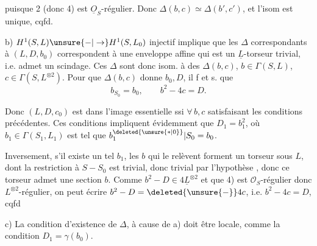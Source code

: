 puisque 2  (donc 4) est $\underline O_S$-régulier. Donc $\Delta(b,c)\simeq\Delta(b',c')$, et l'isom est unique, cqfd.

b)  $H^1(S,L)\unsure{-|\to}H^1(S,L_0)$ injectif implique que les $\Delta$ correspondants à $(L,D,b_0)$ correspondent à une enveloppe affine qui est un $\underline L$-torseur trivial, i.e. admet un scindage. Ces $\Delta$ sont donc isom. à des $\Delta(b,c)$,  $b\in\Gamma(S,L)$, $c\in\Gamma(S,L^{\otimes2})$.  Pour que $\Delta(b,c)$ donne $b_0,D$, il f et s. que
\[b_{S_0}=b_0,\qquad b^2-4c=D.\]

Donc $(L,D,c_0)$ est dans l'image essentielle ssi $\forall\,b,c$ satisfaisant les conditions précédentes. Ces conditions impliquent évidemment que $D_1=b_1^2$, où $b_1\in\Gamma(S_1,L_1)$ est tel que $b_1^{\deleted{\unsure{*|0}}}|S_0=b_0$.

Inversement, s'il existe un tel $b_1$,  les $b$ qui le relèvent forment un torseur sous $L$,  dont la restriction à $S-S_0$ est trivial, donc  trivial par l'hypothèse , donc ce torseur admet  une section $b$. Comme $b^2-D\in4\underline L^{\otimes2}$ et que  4) est $\mathcal O_S$-régulier donc $L^{\otimes2}$-régulier, on peut écrire $b^2-D=\deleted{\unsure{-}}4c$, i.e. $b^2-4c=D$, cqfd

c) La condition d'existence de $\Delta$,  à cause de a) doit être locale,  comme la condition $D_1=\gamma(b_0)$.
